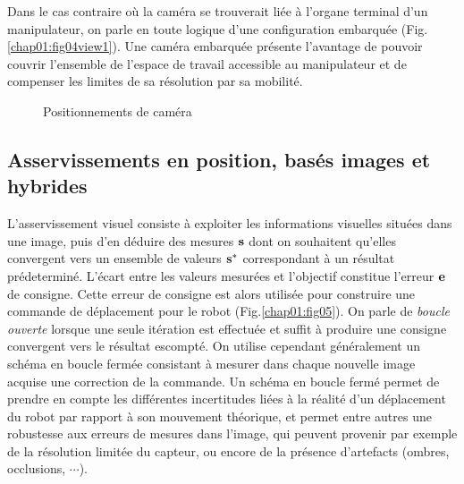 Dans le cas contraire o\`u la cam\'era se trouverait li\'ee \`a l'organe terminal d'un manipulateur, on parle en toute logique d'une configuration embarquée (Fig.\ref{chap01:fig04view1}). Une cam\'era embarqu\'ee pr\'esente l'avantage de pouvoir couvrir l'ensemble de l'espace de travail accessible au manipulateur et de compenser les limites de sa r\'esolution par sa mobilit\'e.

\begin{figure}[htp]
  \centering
   \hfill
    \caption{\footnotesize{Positionnements de caméra}}
\label{chap01:fig04}
\end{figure}

\subsection{Asservissements en position, basés images et hybrides} 
\label{chap1-1-1}

L'asservissement visuel consiste \`a exploiter les informations visuelles situ\'ees dans une image, puis d'en d\'eduire des mesures ${\bf s}$ dont on souhaitent qu'elles convergent vers un ensemble de valeurs ${\bf s}^*$ correspondant \`a un r\'esultat pr\'edetermin\'e. L'\'ecart entre les valeurs mesur\'ees et l'objectif constitue l'erreur ${\bf e}$ de consigne. Cette erreur de consigne est alors utilis\'ee pour construire une commande de d\'eplacement pour le robot (Fig.\ref{chap01:fig05}). On parle de {\it boucle ouverte} lorsque une seule it\'eration est effectu\'ee et suffit \`a produire une consigne convergent vers le r\'esultat escompt\'e. On utilise cependant g\'en\'eralement un sch\'ema en boucle ferm\'ee consistant \`a mesurer dans chaque nouvelle image acquise une correction de la commande. Un sch\'ema en boucle ferm\'e permet de prendre en compte les diff\'erentes incertitudes li\'ees \`a la r\'ealit\'e d'un d\'eplacement du robot par rapport \`a son mouvement th\'eorique, et permet entre autres une robustesse aux erreurs de mesures dans l'image, qui peuvent provenir par exemple de la r\'esolution limit\'ee du capteur, ou encore de la pr\'esence d'artefacts (ombres, occlusions, $\cdots$).

